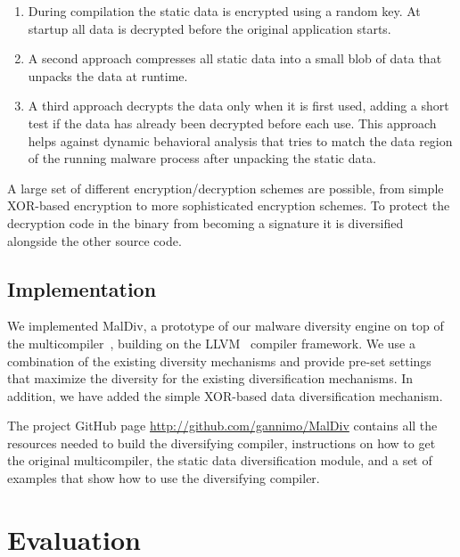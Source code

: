 \documentclass[10pt, preprint]{sigplanconf}
\begin{document}
\begin{enumerate}

\item During compilation the static data is encrypted using a random key. At
startup all data is decrypted before the original application starts.

\item A second approach compresses all static data into a small blob of data
that unpacks the data at runtime.

\item A third approach decrypts the data only when it is first used, adding a
short test if the data has already been decrypted before each use. This
approach helps against dynamic behavioral analysis that tries to match the data
region of the running malware process after unpacking the static data.

\end{enumerate}

A large set of different encryption/decryption schemes are possible, from
simple XOR-based encryption to more sophisticated encryption schemes. To
protect the decryption code in the binary from becoming a signature it is
diversified alongside the other source code.


\subsection{Implementation}

We implemented MalDiv, a prototype of our malware diversity engine on top of
the multicompiler~\cite{multicompiler}, building on the
LLVM~\cite{lattner04cgo} compiler framework. We use a combination of the
existing diversity mechanisms and provide pre-set settings that maximize the
diversity for the existing diversification mechanisms. In addition, we have
added the simple XOR-based data diversification mechanism.

The project GitHub page \url{http://github.com/gannimo/MalDiv} contains all the
resources needed to build the diversifying compiler, instructions on how to get
the original multicompiler, the static data diversification module, and a set of
examples that show how to use the diversifying compiler.



\section{Evaluation}\label{sec:eval}
\end{document}

